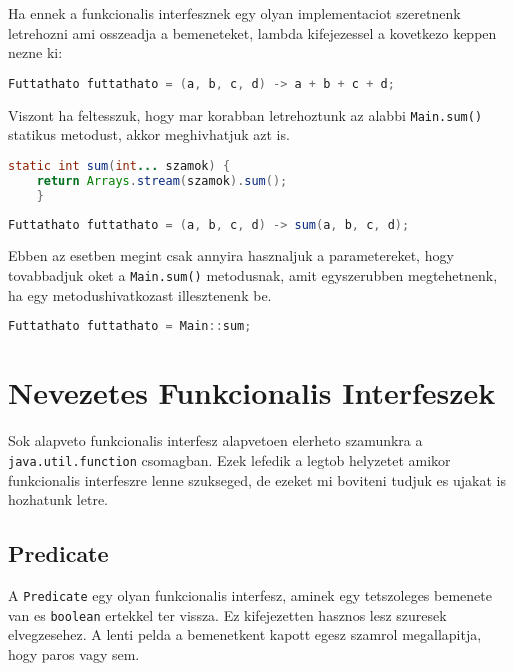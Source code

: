 \documentclass{article}
\let\l\lstinline
\begin{document}
    Ha ennek a funkcionalis interfesznek egy olyan implementaciot szeretnenk letrehozni ami osszeadja a bemeneteket, lambda kifejezessel a kovetkezo keppen nezne ki:

    \begin{lstlisting}[language=Java, caption=Lambda implementacio]
Futtathato futtathato = (a, b, c, d) -> a + b + c + d;
    \end{lstlisting}

    \newpage

    Viszont ha feltesszuk, hogy mar korabban letrehoztunk az alabbi \l{Main.sum()} statikus metodust, akkor meghivhatjuk azt is.

    \begin{lstlisting}[language=Java, caption=Sum() metodus]
    static int sum(int... szamok) {
    return Arrays.stream(szamok).sum();
    }
\end{lstlisting}

\begin{lstlisting}[language=Java, caption=Lambda implementacio metodushivassal]
Futtathato futtathato = (a, b, c, d) -> sum(a, b, c, d);
\end{lstlisting}

Ebben az esetben megint csak annyira hasznaljuk a parametereket, hogy tovabbadjuk oket a \l{Main.sum()} metodusnak, amit egyszerubben megtehetnenk, ha egy metodushivatkozast illesztenenk be.

\begin{lstlisting}[language=Java, caption=Implementacio metodus hivatkozassal]
Futtathato futtathato = Main::sum;
\end{lstlisting}

\newpage


\section{Nevezetes Funkcionalis Interfeszek}

Sok alapveto funkcionalis interfesz alapvetoen elerheto szamunkra a \l{java.util.function} csomagban. Ezek lefedik a legtob helyzetet amikor funkcionalis interfeszre lenne szukseged, de ezeket mi boviteni tudjuk es ujakat is hozhatunk letre.

\subsection{Predicate}

A \l{Predicate} egy olyan funkcionalis interfesz, aminek egy tetszoleges bemenete van es \l{boolean} ertekkel ter vissza. Ez kifejezetten hasznos lesz szuresek elvegzesehez. A lenti pelda a bemenetkent kapott egesz szamrol megallapitja, hogy paros vagy sem.
\end{document}
